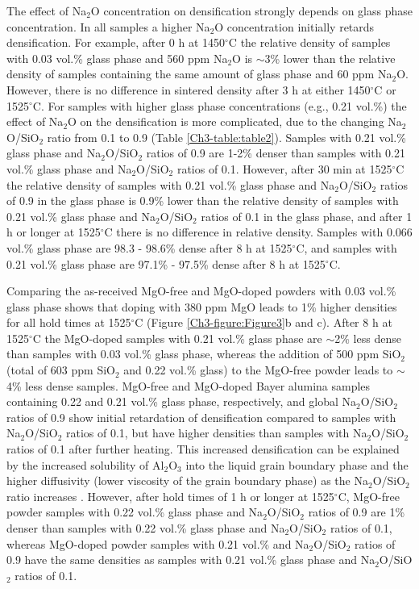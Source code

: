 The effect of Na$_{2}$O concentration on densification strongly depends on glass phase concentration. In all samples a higher Na$_{2}$O concentration initially retards densification. For example, after 0 h at 1450$^{\circ}$C the relative density of samples with 0.03 vol.\% glass phase and 560 ppm Na$_{2}$O is $\sim$3\% lower than the relative density of samples containing the same amount of glass phase and 60 ppm Na$_{2}$O.  However, there is no difference in sintered density after 3 h at either 1450$^{\circ}$C or 1525$^{\circ}$C. For samples with higher glass phase concentrations (e.g., 0.21 vol.\%) the effect of Na$_{2}$O on the densification is more complicated, due to the changing Na$_{2}$O/SiO$_{2}$ ratio from 0.1 to 0.9 (Table \ref{Ch3-table:table2}). Samples with 0.21 vol.\% glass phase and Na$_{2}$O/SiO$_{2}$ ratios of 0.9 are 1-2\% denser than samples with 0.21 vol.\% glass phase and Na$_{2}$O/SiO$_{2}$ ratios of 0.1. However, after 30 min at 1525$^{\circ}$C the relative density of samples with 0.21 vol.\% glass phase and Na$_{2}$O/SiO$_{2}$ ratios of 0.9 in the glass phase is 0.9\% lower than the relative density of samples with 0.21 vol.\% glass phase and Na$_{2}$O/SiO$_{2}$ ratios of 0.1 in the glass phase, and after 1 h or longer at 1525$^{\circ}$C there is no difference in relative density. Samples with 0.066 vol.\% glass phase are 98.3 - 98.6\% dense after 8 h at 1525$^{\circ}$C, and samples with 0.21 vol.\% glass phase are 97.1\% - 97.5\% dense after 8 h at 1525$^{\circ}$C. 

Comparing the as-received MgO-free and MgO-doped powders with 0.03 vol.\% glass phase shows that doping with 380 ppm MgO leads to 1\% higher densities for all hold times at 1525$^{\circ}$C (Figure \ref{Ch3-figure:Figure3}b and c). After 8 h at 1525$^{\circ}$C the MgO-doped samples with 0.21 vol.\% glass phase are $\sim$2\% less dense than samples with 0.03 vol.\% glass phase, whereas the addition of 500 ppm SiO$_{2}$ (total of 603 ppm SiO$_{2}$ and 0.22 vol.\% glass) to the MgO-free powder leads to $\sim$4\% less dense samples. MgO-free and MgO-doped Bayer alumina samples containing 0.22 and 0.21 vol.\% glass phase, respectively, and global Na$_{2}$O/SiO$_{2}$ ratios of 0.9 show initial retardation of densification compared to samples with Na$_{2}$O/SiO$_{2}$ ratios of 0.1, but have higher densities than samples with Na$_{2}$O/SiO$_{2}$ ratios of 0.1 after further heating. This increased densification can be explained by the increased solubility of Al$_{2}$O$_{3}$ into the liquid grain boundary phase and the higher diffusivity (lower viscosity of the grain boundary phase) as the Na$_{2}$O/SiO$_{2}$ ratio increases \cite{Frueh2016a,Kwon1991}. However, after hold times of 1 h or longer at 1525$^{\circ}$C, MgO-free powder samples with 0.22 vol.\% glass phase and Na$_{2}$O/SiO$_{2}$ ratios of 0.9 are 1\% denser than samples with 0.22 vol.\% glass phase and Na$_{2}$O/SiO$_{2}$ ratios of 0.1, whereas MgO-doped powder samples with 0.21 vol.\% and Na$_{2}$O/SiO$_{2}$ ratios of 0.9 have the same densities as samples with 0.21 vol.\% glass phase and Na$_{2}$O/SiO$_{2}$ ratios of 0.1. 

